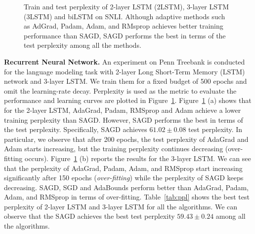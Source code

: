 \documentclass[11pt]{article}
\begin{document}
\begin{figure}[t]
{}
 \caption{Train and test perplexity of 2-layer LSTM (2LSTM),  3-layer LSTM (3LSTM) and biLSTM on SNLI. 
 Although adaptive methods such as AdGrad, Padam, Adam, and RMsprop achieves better training performance than \textsc{SAGD}, \textsc{SAGD} performs the best in terms of the test perplexity among all the methods.
} 
 \label{fig:language}
\end{figure}




\textbf{Recurrent Neural Network.}
An experiment on Penn Treebank is conducted for the language modeling task with 2-layer Long Short-Term Memory (LSTM)~\citep{stni2018} network and 3-layer LSTM. We train them for a fixed budget of 500 epochs and omit the learning-rate decay. Perplexity is used as the metric to evaluate the performance and learning curves are plotted in Figure~\ref{fig:language}. 
Figure~\ref{fig:language} (a) shows that for the 2-layer LSTM, AdaGrad, Padam, RMSprop and Adam achieve a lower training perplexity than \textsc{SAGD}. However, \textsc{SAGD} performs the best in terms of the test perplexity. Specifically, \textsc{SAGD} achieves $61.02 \pm 0.08$ test perplexity. 
In particular, we observe that after 200 epochs, the test perplexity of AdaGrad and Adam starts increasing, but the training perplexity continues decreasing (over-fitting occurs).  
Figure~\ref{fig:language} (b) reports the results for the 3-layer LSTM. We can see that the perplexity of AdaGrad, Padam, Adam, and RMSprop start increasing significantly after 150 epochs (\emph{over-fitting}) while the perplexity of \textsc{SAGD} keeps decreasing. \textsc{SAGD}, SGD and AdaBounds perform better than AdaGrad, Padam, Adam, and RMSprop in terms of over-fitting.
Table~\ref{tab:ppl} shows the best test perplexity of 2-layer LSTM and 3-layer LSTM for all the algorithms. We can observe that the \textsc{SAGD} achieves the best test perplexity $59.43 \pm 0.24$ among all the algorithms. 
\end{document}

